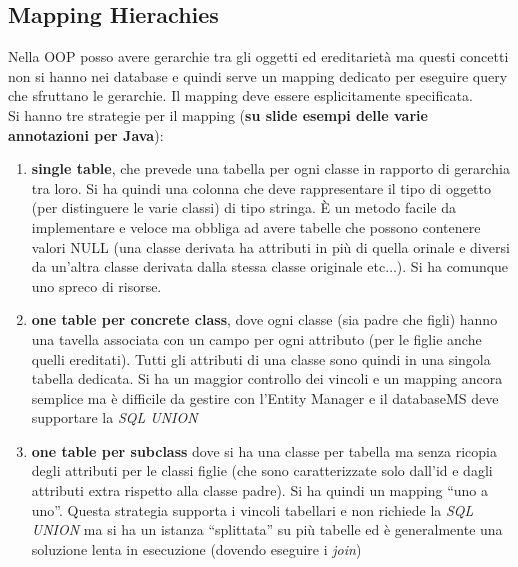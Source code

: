 \subsection{Mapping Hierachies}
Nella OOP posso avere gerarchie tra gli oggetti ed ereditarietà ma questi concetti non si hanno nei database e quindi serve un mapping dedicato per eseguire query che sfruttano le gerarchie. Il mapping deve essere esplicitamente specificata.\\ Si hanno tre strategie per il mapping (\textbf{su slide esempi delle varie annotazioni per Java}):
\begin{enumerate}
      \item \textbf{single table}, che prevede una tabella per ogni classe in rapporto di gerarchia tra loro. Si ha quindi una colonna che deve rappresentare il tipo di oggetto (per distinguere le varie classi) di tipo stringa. È un metodo facile da implementare e veloce ma obbliga ad avere tabelle che possono contenere valori NULL (una classe derivata ha attributi in più di quella orinale e diversi da un'altra classe derivata dalla stessa classe originale etc$\ldots$). Si ha comunque uno spreco di risorse.
      \item \textbf{one table per concrete class}, dove ogni classe (sia padre che figli) hanno una tavella associata con un campo per ogni attributo (per le figlie anche quelli ereditati). Tutti gli attributi di una classe sono quindi in una singola tabella dedicata. Si ha un maggior controllo dei vincoli e un mapping ancora semplice ma è difficile da gestire con l'Entity Manager e il databaseMS deve supportare la \textit{SQL UNION}
      \item \textbf{one table per subclass} dove si ha una classe per tabella ma senza ricopia degli attributi per le classi figlie (che sono caratterizzate solo dall'id e dagli attributi extra rispetto alla classe padre). Si ha quindi un mapping ``uno a uno''. Questa strategia supporta i vincoli tabellari e non richiede la \textit{SQL UNION} ma si ha un istanza ``splittata'' su più tabelle ed è generalmente una soluzione lenta in esecuzione (dovendo eseguire i \textit{join})
\end{enumerate}